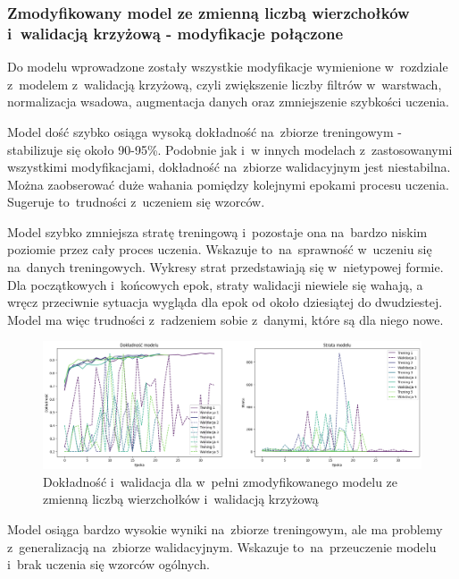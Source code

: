 \subsubsection{Zmodyfikowany model ze zmienną liczbą wierzchołków i~walidacją krzyżową - modyfikacje połączone}

Do modelu wprowadzone zostały wszystkie modyfikacje wymienione w~rozdziale z~modelem z~walidacją krzyżową,
czyli zwiększenie liczby filtrów w~warstwach, normalizacja wsadowa, augmentacja danych oraz zmniejszenie szybkości uczenia.

Model dość szybko osiąga wysoką dokładność na~zbiorze treningowym - stabilizuje się około 90-95\%.
Podobnie jak i~w innych modelach z~zastosowanymi wszystkimi modyfikacjami,
dokładność na~zbiorze walidacyjnym jest niestabilna.
Można zaobserować duże wahania pomiędzy kolejnymi epokami procesu uczenia.
Sugeruje to~trudności z~uczeniem się wzorców.

Model szybko zmniejsza stratę treningową i~pozostaje ona na~bardzo niskim poziomie przez cały proces uczenia.
Wskazuje to~na~sprawność w~uczeniu się na~danych treningowych.
Wykresy strat przedstawiają się w~nietypowej formie.
Dla początkowych i~końcowych epok, straty walidacji niewiele się wahają,
a wręcz przeciwnie sytuacja wygląda dla epok od około dziesiątej do dwudziestej.
Model ma więc trudności z~radzeniem sobie z~danymi, które są dla niego nowe.

\begin{figure}[ht]
	\centering
	\includegraphics[width=15.5cm]{resources/tests/images/v4/multiple_edges_crossvalid_img.png}
	\caption{Dokładność i~walidacja dla w~pełni zmodyfikowanego modelu ze zmienną liczbą wierzchołków i~walidacją krzyżową}
	\label{Fig:tests-csvar-2a}
\end{figure}
\FloatBarrier

Model osiąga bardzo wysokie wyniki na~zbiorze treningowym,
ale ma problemy z~generalizacją na~zbiorze walidacyjnym.
Wskazuje to~na~przeuczenie modelu i~brak uczenia się wzorców ogólnych.

